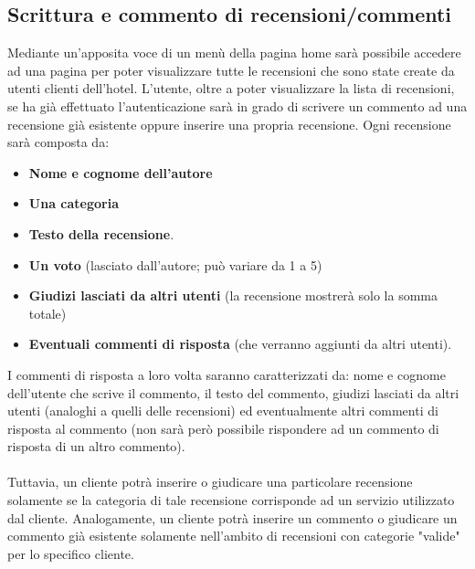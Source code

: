 \documentclass [a4paper, 12pt]{book}
\begin{document}
\subsection{Scrittura e commento di recensioni/commenti}
\label{Recensioni}
Mediante un'apposita voce di un menù della pagina home sarà possibile accedere ad una pagina per poter visualizzare tutte le recensioni che sono state create da utenti clienti dell'hotel. L'utente, oltre a poter visualizzare la lista di recensioni, se ha già effettuato l'autenticazione sarà in grado di scrivere un commento ad una recensione già esistente oppure inserire una propria recensione. Ogni recensione sarà composta da:
\begin{itemize}
\item \textbf{Nome e cognome dell'autore}
\item \textbf{Una categoria}
\item \textbf{Testo della recensione}.
\item \textbf{Un voto} (lasciato dall'autore; può variare da 1 a 5)
\item \textbf{Giudizi lasciati da altri utenti} (la recensione mostrerà solo la somma totale)
\item \textbf{Eventuali commenti di risposta} (che verranno aggiunti da altri utenti).
\end{itemize}
I commenti di risposta a loro volta saranno caratterizzati da: nome e cognome dell'utente che scrive il commento, il testo del commento, giudizi lasciati da altri utenti (analoghi a quelli delle recensioni) ed eventualmente altri commenti di risposta al commento (non sarà però possibile rispondere ad un commento di risposta di un altro commento).\\\\
Tuttavia, un cliente potrà inserire o giudicare una particolare recensione solamente se la categoria di tale recensione corrisponde ad un servizio utilizzato dal cliente. Analogamente, un cliente potrà inserire un commento o giudicare un commento già esistente solamente nell'ambito di recensioni con categorie "valide" per lo specifico cliente.

\medskip
\end{document}
